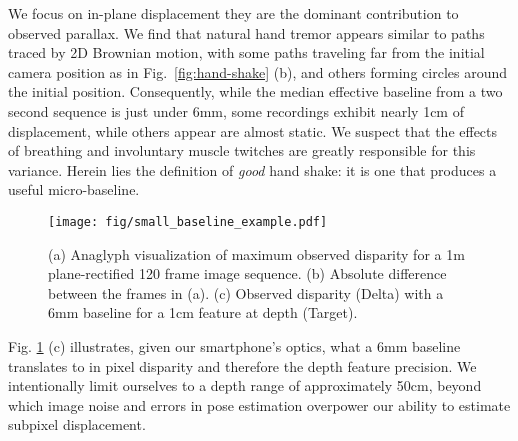 We focus on in-plane displacement they are the dominant contribution to observed parallax. We find that natural hand tremor appears similar to paths traced by 2D Brownian motion, with some paths traveling far from the initial camera position as in Fig.~\ref{fig:hand-shake} (b), and others forming circles around the initial position. Consequently, while the median effective baseline from a two second sequence is just under 6mm, some recordings exhibit nearly 1cm of displacement, while others appear are almost static. We suspect that the effects of breathing and involuntary muscle twitches are greatly responsible for this variance. Herein lies the definition of \emph{good} hand shake: it is one that produces a useful micro-baseline.
\begin{figure}[t!]
    \centering
    \texttt{[image: fig/small\_baseline\_example.pdf]}
    \caption{(a) Anaglyph visualization of maximum observed disparity for a 1m plane-rectified 120 frame image sequence. (b) Absolute difference between the frames in (a). (c) Observed disparity (Delta) with a 6mm baseline for a 1cm feature at depth (Target). }
    \label{fig:disparity-curve}
    \vspace{-1em}
\end{figure}
Fig. \ref{fig:disparity-curve} (c) illustrates, given our smartphone's optics, what a 6mm baseline translates to in pixel disparity and therefore the depth feature precision. We intentionally limit ourselves to a depth range of approximately 50cm, beyond which image noise and errors in pose estimation overpower our ability to estimate subpixel displacement.